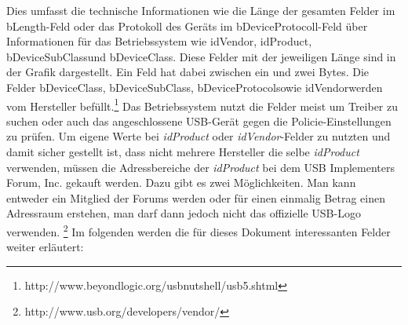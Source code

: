 Dies umfasst die technische Informationen wie die Länge der gesamten Felder im \glqq bLength\grqq-Feld oder das Protokoll des Geräts im \glqq bDeviceProtocoll\grqq-Feld über Informationen für das Betriebssystem wie \glqq idVendor\grqq, \glqq idProduct\grqq, \glqq bDeviceSubClass\grqq und \glqq bDeviceClass\grqq. Diese Felder mit der jeweiligen Länge sind in der Grafik dargestellt. Ein Feld hat dabei zwischen ein und zwei Bytes. Die Felder \glqq bDeviceClass\grqq, \glqq bDeviceSubClass\grqq, \glqq bDeviceProtocol\grqq sowie \glqq idVendor\grqq werden vom Hersteller befüllt.\footnote{http://www.beyondlogic.org/usbnutshell/usb5.shtml} Das Betriebssystem nutzt die Felder meist um Treiber zu suchen oder auch das angeschlossene USB-Gerät gegen die Policie-Einstellungen zu prüfen. Um eigene Werte bei \textit{idProduct} oder \textit{idVendor}-Felder zu nutzten und damit sicher gestellt ist, dass nicht mehrere Hersteller die selbe \textit{idProduct} verwenden, müssen die Adressbereiche der \textit{idProduct} bei dem USB Implementers Forum, Inc. gekauft werden. Dazu gibt es zwei Möglichkeiten. Man kann entweder ein Mitglied der Forums werden oder für einen einmalig Betrag einen Adressraum erstehen, man darf dann jedoch nicht das offizielle USB-Logo verwenden. \footnote{http://www.usb.org/developers/vendor/} Im folgenden werden die für dieses Dokument interessanten Felder weiter erläutert:

